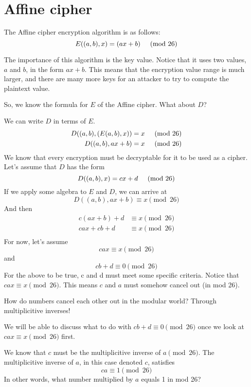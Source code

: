 \section{Affine cipher}

The Affine cipher encryption algorithm is as follows:
\[
E((a, b), x) = (ax + b) \hspace{0.5cm}\text{(mod 26)}
\]

The importance of this algorithm is the key value. Notice that it uses
two values, $a$ and $b$, in the form $ax + b$. This means that the
encryption value range is much larger, and there are many more keys
for an attacker to try to compute the plaintext value.

So, we know the formula for $E$ of the Affine cipher. What about $D$?

We can write $D$ in terms of $E$.
\begin{align*}
D((a, b), (E(a, b), x)) &= x \hspace{0.5cm}\text{(mod 26)}\\ 
D((a, b), ax + b) &= x \hspace{0.5cm}\text{(mod 26)}\\
\end{align*}
We know that every encryption must be decryptable for it to be used
as a cipher.
Let's assume that $D$ has the form
\[
D((a, b), x) = cx + d \hspace{0.5cm}\text{(mod 26)}
\]
If we apply some algebra to $E$ and $D$, we can arrive at
\[
D((a, b), ax + b) \equiv x \pmod{26}
\]
And then
\begin{align*}
  c(ax + b) + d &\equiv x \pmod{26} \\
  cax + cb + d &\equiv x \pmod{26} \\
\end{align*}
For now, let's assume
\[
cax \equiv x \pmod{26}
\]
and
\[
cb + d \equiv 0 \pmod{26}
\]
For the above to be true, c and d must meet some specific criteria.
Notice that $cax \equiv x \pmod{26}$. This means $c$ and $a$ must
somehow cancel out (in mod 26).

How do numbers cancel each other out in the modular world? Through
multiplicitive inverses! 

We will be able to discuss what to do with $cb + d \equiv 0 \pmod{26}$
once we look at $cax \equiv x \pmod{26}$ first.

We know that $c$ must be the multiplicitive inverse of $a \pmod{26}$.
The multiplicitive inverse of $a$, in this case denoted $c$, satisfies
\[
ca \equiv 1 \pmod{26}
\]
In other words, what number multiplied by $a$ equals 1 in mod 26?

